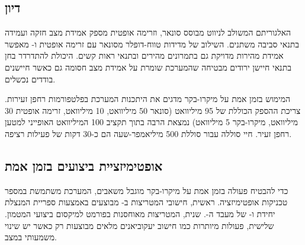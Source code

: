 \begin{table}[htbp]
\centering
\caption{השוואת חיישני זרימה אופטית: מצלמה סטנדרטית לעומת מצלמה מבוססת אירועים. (Comparison of optical flow sensors: standard camera vs. event-based camera.)}
\label{tab:ch06_flow_sensors}
\end{table}

\subsection{דיון}
\label{sec:ch06_discussion}

האלגוריתם המשולב לניווט מבוסס סונאר,  וזרימה אופטית מספק אמידת מצב חזקה ועמידה בתנאי סביבה משתנים. השילוב של מדידות טווח-דופלר מסונאר עם זרימה אופטית ו- מאפשר אמידת מהירות מדויקת גם בתמרונים מהירים ובתנאי ראות קשים. היכולת להתדרדר בחן בתנאי חיישן ירודים מבטיחה שהמערכת שומרת על אמידת מצב חסומה גם כאשר חיישנים בודדים נכשלים.

המימוש בזמן אמת על מיקרו-בקר  מדגים את היתכנות המערכת בפלטפורמות רחפן זעירות. צריכת ההספק הכוללת של 95 מיליוואט (סונאר 50 מיליוואט,  10 מיליוואט, זרימה אופטית 30 מיליוואט, מיקרו-בקר 5 מיליוואט) נמצאת הרבה בתוך תקציב 100 המיליוואט האופייני למטען רחפן זעיר. חיי סוללה עבור סוללת  500 מיליאמפר-שעה הם כ-30 דקות של פעילות רציפה.

\subsection{אופטימיזציית ביצועים בזמן אמת}
\label{sec:ch06_real_time_optimization}

כדי להבטיח פעולה בזמן אמת על מיקרו-בקר מוגבל משאבים, המערכת משתמשת במספר טכניקות אופטימיזציה. ראשית, חישובי המטריצות ב- מבוצעים באמצעות ספריית  המנצלת יחידת  ו- של מעבד ה-. שנית, המטריצות מאוחסנות בפורמט  למיקסום ביצועי המטמון. שלישית, פעולות מיותרות כמו חישוב יעקוביאנים מלאים מבוצעות רק כאשר יש שינוי משמעותי במצב.


